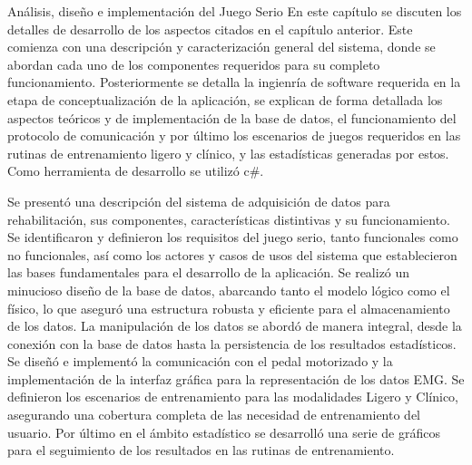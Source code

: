 \begin{thesischapter}{2} {Análisis, diseño e implementación del Juego Serio}
En este capítulo se discuten los detalles de desarrollo de los aspectos citados en el capítulo anterior. Este comienza con una descripción y caracterización general del sistema, donde se  abordan cada uno de los componentes requeridos para su completo funcionamiento. Posteriormente se detalla la ingienría de software requerida en la etapa de conceptualización de la aplicación, se explican de forma detallada los aspectos teóricos y de implementación de la base de datos, el funcionamiento del protocolo de comunicación y por último los escenarios de juegos requeridos en las rutinas de entrenamiento ligero y clínico, y las estadísticas generadas por estos. Como herramienta de desarrollo se utilizó c\#.


     
    

















Se presentó una descripción del sistema de adquisición de datos para rehabilitación, sus componentes, características distintivas y su funcionamiento. Se identificaron y definieron los requisitos del juego  serio, tanto funcionales como no funcionales, así como los actores y casos de usos del sistema que establecieron las bases fundamentales para el desarrollo de la aplicación. Se realizó un minucioso diseño de la base de datos, abarcando tanto el modelo lógico como el físico, lo que aseguró una estructura robusta y eficiente para el almacenamiento de los datos. La manipulación de los datos se abordó de manera integral, desde la conexión con la base de datos hasta la persistencia de los resultados estadísticos. Se diseñó e implementó la comunicación con el pedal motorizado y la implementación de la interfaz gráfica para la representación de los datos EMG. Se definieron los escenarios de entrenamiento para las modalidades Ligero y Clínico, asegurando una cobertura completa de las necesidad de entrenamiento del usuario. Por último en el ámbito estadístico se desarrolló una serie de gráficos para el seguimiento de los resultados en las rutinas de entrenamiento.   
    
\end{thesischapter}